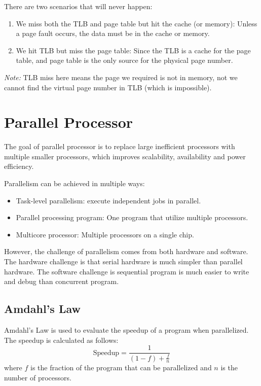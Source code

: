 \documentclass[a4paper,12pt]{article}
\begin{document}
\begin{warningbox}
	There are two scenarios that will never happen:
	\begin{enumerate}
		\item We miss both the TLB and page table but hit the cache (or memory): Unless a page fault occurs, the data must be in the cache or memory.
		\item We hit TLB but miss the page table: Since the TLB is a cache for the page table, and page table is the only source for the physical page number.
	\end{enumerate}
	\textit{Note:} TLB miss here means the page we required is not in memory, not we cannot find the virtual page number in TLB (which is impossible).
\end{warningbox}

\section{Parallel Processor}

The goal of parallel processor is to replace large inefficient processors with multiple smaller processors, which improves scalability, availability and power efficiency. 

Parallelism can be achieved in multiple ways:
\begin{itemize}
	\item Task-level parallelism: execute independent jobs in parallel.
	\item Parallel processing program: One program that utilize multiple processors.
	\item Multicore processor: Multiple processors on a single chip.
\end{itemize}

However, the challenge of parallelism comes from both hardware and software. The hardware challenge is that serial hardware is much simpler than parallel hardware. The software challenge is sequential program is much easier to write and debug than concurrent program.

\subsection{Amdahl's Law}

Amdahl's Law is used to evaluate the speedup of a program when parallelized. The speedup is calculated as follows:
\begin{equation*}
	\text{Speedup} = \frac{1}{(1 - f) + \frac{f}{n}}
\end{equation*}
where $f$ is the fraction of the program that can be parallelized and $n$ is the number of processors.
\end{document}
